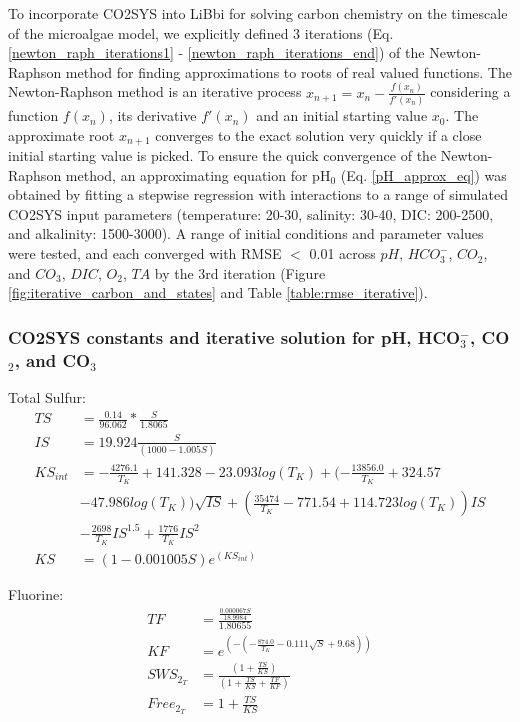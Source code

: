 \documentclass{ruthesis}
\begin{document}
To incorporate CO2SYS into LiBbi for solving carbon chemistry on the timescale of the microalgae model, we explicitly defined 3 iterations (Eq. \ref{newton_raph_iterations1} - \ref{newton_raph_iterations_end}) of the Newton-Raphson method for finding approximations to roots of real valued functions. The Newton-Raphson method is an iterative process 
$ x_{n+1} = x_n - \frac{f(x_n)}{f'(x_n)} $
considering a function $f(x_n)$, its derivative $f'(x_n)$ and an initial starting value $x_0$. The approximate root $x_{n+1}$ converges to the exact solution very quickly if a close initial starting value is picked. To ensure the quick convergence of the Newton-Raphson method, an approximating equation for pH$_0$ (Eq. \ref{pH_approx_eq}) was obtained by fitting a stepwise regression with interactions to a range of simulated CO2SYS input parameters (temperature: 20-30, salinity: 30-40, DIC: 200-2500, and alkalinity: 1500-3000). A range of initial conditions and parameter values were tested, and each converged with RMSE $<$ 0.01 across $pH$, $HCO_3^-$, $CO_2$, and $CO_3$, $DIC$, $O_2$, $TA$ by the 3rd iteration (Figure \ref{fig:iterative_carbon_and_states} and Table \ref{table:rmse_iterative}).



\subsubsection{CO2SYS constants and iterative solution for pH, HCO$_3^-$, CO$_2$, and CO$_3$}

Total Sulfur:
\begin{align*}
TS     	&= \frac{0.14}{96.062} * \frac{S}{1.8065} \nonumber \\
IS     	&= 19.924 \frac{S}{(1000 - 1.005 S)} \nonumber \\
KS_{int} 	&= -\frac{4276.1}{T_K} + 141.328 - 23.093 log(T_K) + (-\frac{13856.0}{T_K} + 324.57 \nonumber\\ 			 
& - 47.986 log(T_K)) \sqrt{IS} + ( \frac{35474}{T_K} - 771.54  + 114.723 log(T_K)) IS \nonumber \\
& - \frac{2698}{T_K} IS^{1.5} + \frac{1776}{T_K} IS^2 \nonumber \\
KS     	&=  (1 - 0.001005 S)e^{(KS_{int})} \nonumber 
\end{align*}

Fluorine:
\begin{align*}
TF       	&= \frac{\frac{0.000067 S}{18.9984}}{1.80655} \nonumber \\
KF       	&= e^{(-(-\frac{874.0}{T_K} - 0.111 \sqrt{S} + 9.68))} \nonumber \\
SWS_{2_T}  	&= \frac{(1 + \frac{TS}{KS})}{(1 + \frac{TS}{KS} + \frac{TF}{KF})} \nonumber \\
Free_{2_T} 	&= 1 + \frac{TS}{KS} \nonumber 
\end{align*}
\end{document}
